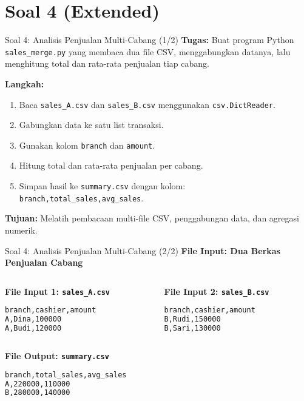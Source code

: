 \documentclass[aspectratio=169, table]{beamer}
\begin{document}
\section{Soal 4 (Extended)}
\begin{frame}[fragile]{Soal 4: Analisis Penjualan Multi-Cabang (1/2)}
\vspace{10pt}
\textbf{Tugas:}  
Buat program Python \texttt{sales\_merge.py} yang membaca dua file CSV, menggabungkan datanya, lalu menghitung total dan rata-rata penjualan tiap cabang.

\textbf{Langkah:}
\begin{enumerate}
  \item Baca \texttt{sales\_A.csv} dan \texttt{sales\_B.csv} menggunakan \texttt{csv.DictReader}.
  \item Gabungkan data ke satu list transaksi.
  \item Gunakan kolom \texttt{branch} dan \texttt{amount}.
  \item Hitung total dan rata-rata penjualan per cabang.
  \item Simpan hasil ke \texttt{summary.csv} dengan kolom:  
        \texttt{branch,total\_sales,avg\_sales}.
\end{enumerate}
\textbf{Tujuan:}  
Melatih pembacaan multi-file CSV, penggabungan data, dan agregasi numerik.
\end{frame}

\begin{frame}[fragile]{Soal 4: Analisis Penjualan Multi-Cabang (2/2)}
\vspace{10pt}
\textbf{File Input: Dua Berkas Penjualan Cabang}

\begin{columns}[t]
  \begin{column}{0.48\textwidth}
  \textbf{File Input 1: \texttt{sales\_A.csv}}
  \begin{lstlisting}[language=bash,basicstyle=\ttfamily\small]
branch,cashier,amount
A,Dina,100000
A,Budi,120000
  \end{lstlisting}
  \end{column}

  \begin{column}{0.48\textwidth}
  \textbf{File Input 2: \texttt{sales\_B.csv}}
  \begin{lstlisting}[language=bash,basicstyle=\ttfamily\small]
branch,cashier,amount
B,Rudi,150000
B,Sari,130000
  \end{lstlisting}
  \end{column}
\end{columns}

\vspace{5pt}
\textbf{File Output: \texttt{summary.csv}}
\begin{lstlisting}[language=bash,basicstyle=\ttfamily\small]
branch,total_sales,avg_sales
A,220000,110000
B,280000,140000
\end{lstlisting}
\end{frame}
\end{document}
